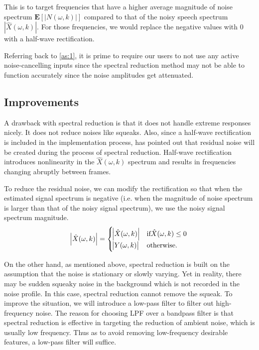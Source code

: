 This is to target frequencies that have a higher average magnitude of noise spectrum $\textbf{E}[|N(\omega,k)|]$ compared to that of 
the noisy speech spectrum $|\hat{X}(\omega,k)|$. For those frequencies, we would replace the negative values with 0 with a half-wave 
rectification.

Referring back to \cref{as:1}, it is prime to require our users to not use any active noise-cancelling inputs since the spectral reduction
method may not be able to function accurately since the noise amplitudes get attenuated.

\subsection{Improvements}
A drawback with spectral reduction is that it does not handle extreme responses nicely. It does not reduce noises like
squeaks. Also, since a half-wave rectification is included in the implementation process, \cite{spectral_drawback} has 
pointed out that residual noise will be created during the process of spectral reduction. Half-wave rectification introduces
nonlinearity in the $\hat{X}(\omega,k)$ spectrum and results in frequencies changing abruptly between frames.

To reduce the residual noise, we can modify the rectification so that when the estimated 
signal spectrum is negative (i.e. when the magnitude of noise spectrum is larger than that of the 
noisy signal spectrum), we use the noisy signal spectrum magnitude.
\begin{equation}
    \abs{\hat{X}(\omega,k)} = \begin{cases}
        \abs{\hat{X}(\omega,k)}   & \text{if} \hat{X}(\omega,k) \leq 0\\
        \abs{Y(\omega,k)}                   & \text{otherwise.}
    \end{cases}
\end{equation}

On the other hand, as mentioned above, spectral reduction is built on the assumption that the noise is stationary or slowly varying. Yet in reality,
there may be sudden squeaky noise in the background which is not recorded in the noise profile. In this case, spectral reduction 
cannot remove the squeak. To improve the situation, we will introduce a low-pass filter to filter out high-frequency noise. The reason
for choosing LPF over a bandpass filter is that spectral reduction is effective in targeting the reduction of ambient noise, which is
 usually low frequency. Thus as to avoid removing low-frequency desirable features, a low-pass filter will suffice.

